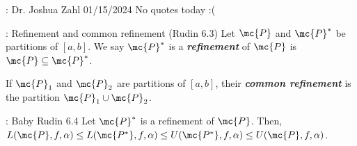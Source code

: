 \begin{nquote}{:  Dr. Joshua Zahl 01/15/2024}
	No quotes today :(
\end{nquote}

\begin{ndef}{: Refinement and common refinement (Rudin 6.3)}
	Let \(\mc{P}\) and \(\mc{P}^*\) be partitions of \([a,b]\). We say \(\mc{P}^*\) is a \emph{\textbf{refinement}} of \(\mc{P}\) is \(\mc{P}\subseteq\mc{P}^*\). 
	
	\medskip
	
	If \(\mc{P}_1\) and \(\mc{P}_2\) are partitions of \([a,b]\), their \emph{\textbf{common refinement}} is the partition \(\mc{P}_1\cup\mc{P}_2\). 
\end{ndef}

\begin{ntheorem}{: Baby Rudin 6.4}
	Let \(\mc{P}^*\) is a refinement of \(\mc{P}\). Then, \(L(\mc{P},f,\alpha)\leq L(\mc{P^*},f,\alpha)\leq U(\mc{P^*},f,\alpha)\leq U(\mc{P},f,\alpha)\).
\end{ntheorem}
